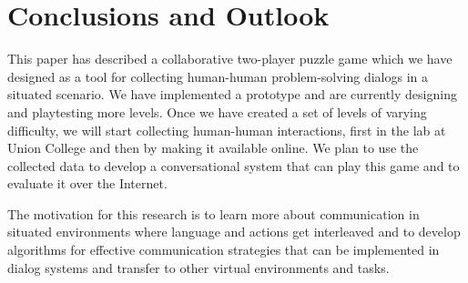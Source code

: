 
\section{Conclusions and Outlook}

This paper has described a collaborative two-player puzzle game which
we have designed as a tool for collecting human-human problem-solving
dialogs in a situated scenario. We have implemented a prototype and
are currently designing and playtesting more levels. Once we have
created a set of levels of varying difficulty, we will start
collecting human-human interactions, first in the lab at Union College
and then by making it available online.
We plan to use the collected data to develop a conversational system
that can play this game and to evaluate it over the Internet.

The motivation for this research is to learn more about communication
in situated environments where language and actions get interleaved
and to develop algorithms for effective communication strategies that
can be implemented in dialog systems and transfer to other virtual
environments and tasks.

